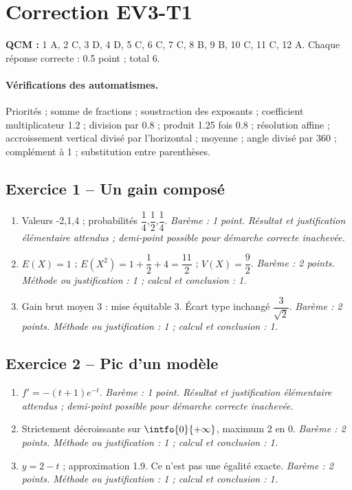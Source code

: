 \mxnewpage\section*{Correction EV3-T1}\label{EV3-T1-CORR}
\textbf{QCM :} 1 A, 2 C, 3 D, 4 D, 5 C, 6 C, 7 C, 8 B, 9 B, 10 C, 11 C, 12 A. Chaque réponse correcte : \num{0,5} point ; total 6.
\paragraph{Vérifications des automatismes.} Priorités ; somme de fractions ; soustraction des exposants ; coefficient multiplicateur \num{1,2} ; division par \num{0,8} ; produit \num{1,25} fois \num{0,8} ; résolution affine ; accroissement vertical divisé par l’horizontal ; moyenne ; angle divisé par 360 ; complément à 1 ; substitution entre parenthèses.
\subsection*{Exercice 1 -- Un gain composé}
\begin{enumerate}
\item Valeurs -2,1,4 ; probabilités $\dfrac{1}{4}$,$\dfrac{1}{2}$,$\dfrac{1}{4}$. \textit{Barème : 1 point. Résultat et justification élémentaire attendus ; demi-point possible pour démarche correcte inachevée.}
\item $E(X)=1$ ; $E(X^2)=1+\dfrac{1}{2}+4=\dfrac{11}{2}$ ; $V(X)=\dfrac{9}{2}$. \textit{Barème : 2 points. Méthode ou justification : 1 ; calcul et conclusion : 1.}
\item Gain brut moyen 3 : mise équitable 3. Écart type inchangé $\dfrac{3}{\sqrt 2}$. \textit{Barème : 2 points. Méthode ou justification : 1 ; calcul et conclusion : 1.}
\end{enumerate}
\subsection*{Exercice 2 -- Pic d’un modèle}
\begin{enumerate}
\item $f\prime=-(t+1)e^{-t}$. \textit{Barème : 1 point. Résultat et justification élémentaire attendus ; demi-point possible pour démarche correcte inachevée.}
\item Strictement décroissante sur $\intfo{0}{+\infty}$, maximum 2 en 0. \textit{Barème : 2 points. Méthode ou justification : 1 ; calcul et conclusion : 1.}
\item $y=2-t$ ; approximation \num{1,9}. Ce n’est pas une égalité exacte. \textit{Barème : 2 points. Méthode ou justification : 1 ; calcul et conclusion : 1.}
\end{enumerate}
